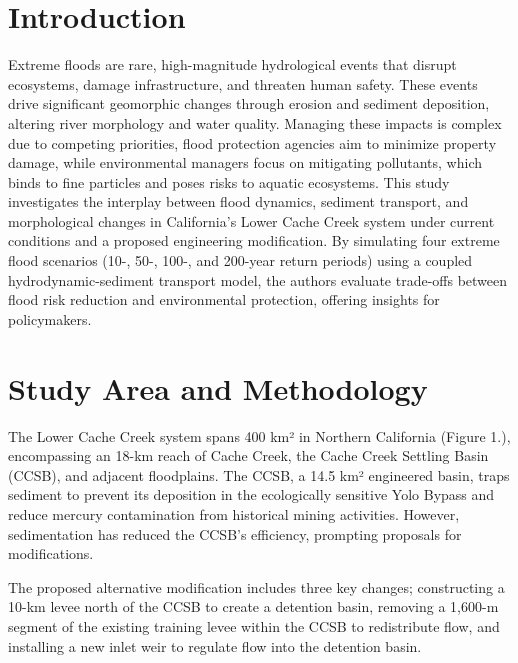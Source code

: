 \documentclass[a4paper, 11pt]{article}
\begin{document}
\newpage
\renewcommand{\contentsname}{Table of Contents} 
\begin{center}
    \tableofcontents
\end{center}
\newpage

\section{Introduction}

\hspace*{0.5cm}Extreme floods are rare, high-magnitude hydrological events that disrupt ecosystems, damage infrastructure, and threaten human safety. These events drive significant geomorphic changes through erosion and sediment deposition, altering river morphology and water quality. Managing these impacts is complex due to competing priorities, flood protection agencies aim to minimize property damage, while environmental managers focus on mitigating pollutants, which binds to fine particles and poses risks to aquatic ecosystems. This study investigates the interplay between flood dynamics, sediment transport, and morphological changes in California’s Lower Cache Creek system under current conditions and a proposed engineering modification. By simulating four extreme flood scenarios (10-, 50-, 100-, and 200-year return periods) using a coupled hydrodynamic-sediment transport model, the authors evaluate trade-offs between flood risk reduction and environmental protection, offering insights for policymakers.

\section{Study Area and Methodology}
\hspace*{0.5cm}The Lower Cache Creek system spans 400 km² in Northern California (Figure 1.), encompassing an 18-km reach of Cache Creek, the Cache Creek Settling Basin (CCSB), and adjacent floodplains. The CCSB, a 14.5 km² engineered basin, traps sediment to prevent its deposition in the ecologically sensitive Yolo Bypass and reduce mercury contamination from historical mining activities. However, sedimentation has reduced the CCSB’s efficiency, prompting proposals for modifications.

The proposed alternative modification includes three key changes; constructing a 10-km levee north of the CCSB to create a detention basin, removing a 1,600-m segment of the existing training levee within the CCSB to redistribute flow, and installing a new inlet weir to regulate flow into the detention basin.
\end{document}

